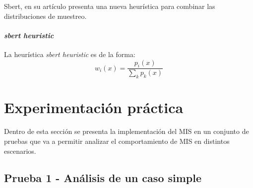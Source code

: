 \documentclass{article}
\begin{document}
Sbert, en su artículo \cite{Sbert2016} presenta una nueva heurística para combinar las distribuciones de muestreo.

\paragraph{\textit{sbert heuristic}} La heurística \textit{sbert heuristic} es de la forma:
$$ w_{i}(x) = \frac{p_{i}(x)}{\sum_{k} p_{k}(x)}$$




\section{Experimentación práctica}

Dentro de esta sección se presenta la implementación del MIS en un conjunto de pruebas que va a permitir analizar el comportamiento de MIS en distintos escenarios.

\subsection{Prueba 1 - Análisis de un caso simple}
\end{document}
